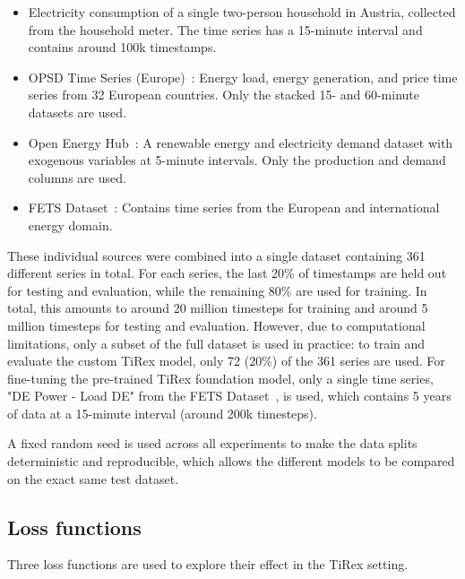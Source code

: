 \documentclass[a4paper,oneside,10pt,ngerman,english]{scrartcl}
\begin{document}
\begin{itemize}[]
	\item Electricity consumption of a single two-person household in Austria, collected from the household meter. The time series has a 15-minute interval and contains around 100k timestamps.
	\item OPSD Time Series (Europe)~\cite{opsd}: Energy load, energy generation, and price time series from 32 European countries. Only the stacked 15- and 60-minute datasets are used.
	\item Open Energy Hub~\cite{openenergyhub}: A renewable energy and electricity demand dataset with exogenous variables at 5-minute intervals. Only the production and demand columns are used.
	\item FETS Dataset~\cite{obermeier_2026_19418721}: Contains time series from the European and international energy domain.
\end{itemize}

These individual sources were combined into a single dataset containing 361 different series in total. For each series, the last 20\% of timestamps are held out for testing and evaluation, while the remaining 80\% are used for training. In total, this amounts to around 20 million timesteps for training and around 5 million timesteps for testing and evaluation. However, due to computational limitations, only a subset of the full dataset is used in practice: to train and evaluate the custom TiRex model, only 72 (20\%) of the 361 series are used. For fine-tuning the pre-trained TiRex foundation model, only a single time series, "DE Power - Load DE" from the FETS Dataset~\cite{obermeier_2026_19418721}, is used, which contains 5 years of data at a 15-minute interval (around 200k timesteps).

A fixed random seed is used across all experiments to make the data splits deterministic and reproducible, which allows the different models to be compared on the exact same test dataset.

\subsection{Loss functions}
\label{sec:loss}

Three loss functions are used to explore their effect in the TiRex setting.
 
\end{document}
